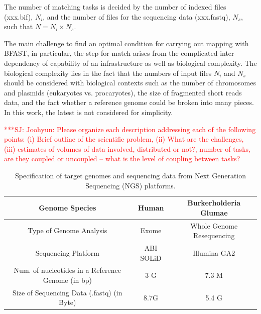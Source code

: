 \documentclass[12pt]{article}
\newcommand{\jhanote}[1]{ {\textcolor{red}     {***SJ: #1}}}
\newcommand{\jhanote}[1]{}
\begin{document}

The number of matching tasks is decided by the number of indexed files
(xxx.bif), $N_i$, and the number of files for the sequencing data
(xxx.fastq), $N_s$, such that $N = N_i \times N_s$.




The main challenge to find an optimal condition for carrying out
mapping with BFAST, in particular, the step for match arises from the
complicated inter-dependency of capability of an infrastructure as
well as biological complexity.  The biological complexity lies in the
fact that the numbers of input files $N_i$ and $N_s$ should be
considered with biological contexts such as the number of chromosomes
and plasmids (eukaryotes vs. procaryotes), the size of fragmented
short reads data, and the fact whether a reference genome could be
broken into many pieces.  In this work, the latest is not considered
for simplicity.  



\jhanote{Joohyun: Please organize each description addressing each of
  the following points: (i) Brief outline of the scientific problem,
  (ii) What are the challenges, (iii) estimates of volumes of data
  involved, distributed or not?, number of tasks, are they coupled or
  uncoupled -- what is the level of coupling between tasks?}

\begin{table}
\begin{tabular}{|c|cc|} 
  \hline 
  Genome Species & Human  & Burkerholderia Glumae  \\ \hline
  Type of Genome Analysis &  Exome  & Whole Genome Resequencing \\
  Sequencing Platform & ABI SOLiD  &  Illumina GA2 \\
  Num. of nucleotides in a Reference Genome (in bp) &  3 G & 7.3 M \\
  Size of Sequencing Data (.fastq) (in Byte) & 8.7G & 5.4 G \\

\hline
\end{tabular} \caption{Specification of target genomes and sequencing data from Next Generation Sequencing (NGS) platforms.}
 \label{table:two-genomes} 
\end{table}
\end{document}
